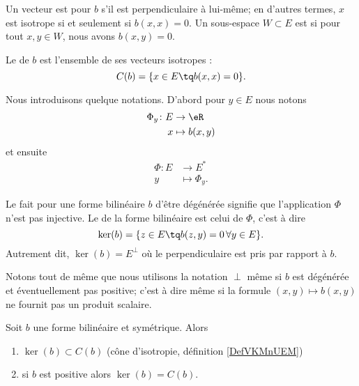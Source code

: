 \begin{definition}[Isotropie]   \label{DefVKMnUEM}
    Un vecteur est  pour \( b\) s'il est perpendiculaire à lui-même; en d'autres termes, \( x\) est isotrope si et seulement si \( b(x,x)=0\). Un sous-espace \( W\subset E\) est  si pour tout \( x,y\in W\), nous avons \( b(x,y)=0\).

    Le  de \( b\) est l'ensemble de ses vecteurs isotropes :
    \begin{equation}
        C(b)=\{ x\in E\tq b(x,x)=0 \}.
    \end{equation}
\end{definition}
Nous introduisons quelque notations. D'abord pour \( y\in E\) nous notons
\begin{equation}
    \begin{aligned}
        \Phi_y\colon E&\to \eR \\
        x&\mapsto b(x,y) 
    \end{aligned}
\end{equation}
et ensuite
\begin{equation}
    \begin{aligned}
        \Phi\colon E&\to E^* \\
        y&\mapsto \Phi_y. 
    \end{aligned}
\end{equation}
\begin{definition}
    Le fait pour une forme bilinéaire \( b\) d'être dégénérée signifie que l'application \( \Phi\) n'est pas injective. Le  de la forme bilinéaire est celui de \( \Phi\), c'est à dire
    \begin{equation}
        \ker(b)=\{ z\in E\tq b(z,y)=0\,\forall y\in E \}.
    \end{equation}
    Autrement dit, \( \ker(b)=E^{\perp}\) où le perpendiculaire est pris par rapport à \( b\).
\end{definition}
Notons tout de même que nous utilisons la notation \( \perp\) même si \( b\) est dégénérée et éventuellement pas positive; c'est à dire même si la formule \( (x,y)\mapsto b(x,y)\) ne fournit pas un produit scalaire.

\begin{proposition}     \label{PropHIWjdMX}
    Soit \( b\) une forme bilinéaire et symétrique. Alors
    \begin{enumerate}
        \item
            \( \ker(b)\subset C(b)\) (cône d'isotropie, définition \ref{DefVKMnUEM})
        \item
            si \( b\) est positive alors \( \ker(b)=C(b)\).
    \end{enumerate}
\end{proposition}

